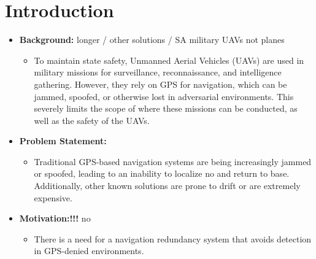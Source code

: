 \section{Introduction}
\begin{itemize}
    \item \textbf{Background:} longer / other solutions / SA military UAVs not planes 
    \begin{itemize}
        \item To maintain state safety, Unmanned Aerial Vehicles (UAVs) are used in military missions for surveillance, reconnaissance, and intelligence gathering. However, they rely on GPS for navigation, which can be jammed, spoofed, or otherwise lost in adversarial environments. This severely limits the scope of where these missions can be conducted, as well as the safety of the UAVs.
    \end{itemize}
    \item \textbf{Problem Statement:}
    \begin{itemize}
        \item Traditional GPS-based navigation systems are being increasingly jammed or spoofed, leading to an inability to localize no and return to base. Additionally, other known solutions are prone to drift or are extremely expensive. 
    \end{itemize}
    \item \textbf{Motivation:!!!} no
    \begin{itemize}
        \item There is a need for a navigation redundancy system that avoids detection in GPS-denied environments. 
    \end{itemize}
\end{itemize}

